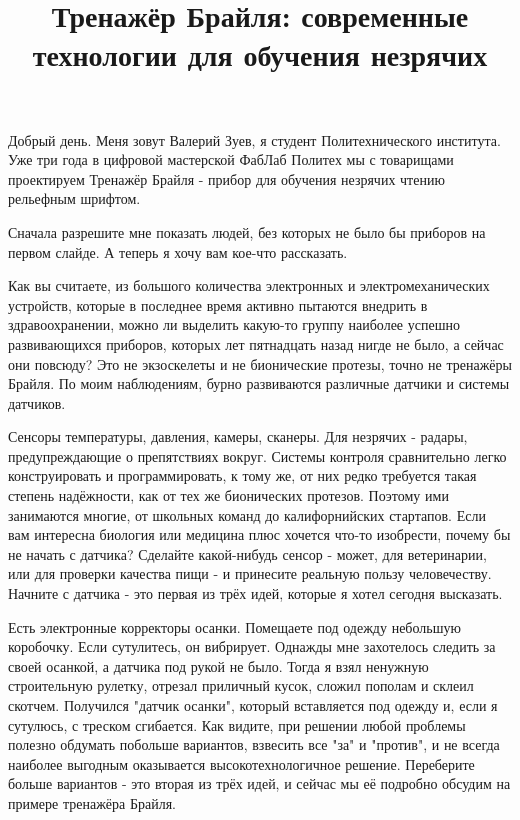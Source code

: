 \documentclass[a4paper,12pt]{article} %
\begin{document}
	
\title{Тренажёр Брайля: современные технологии для обучения незрячих}
\date{\vspace{-5ex}} %

Добрый день. Меня зовут Валерий Зуев, я студент Политехнического института. Уже три года в цифровой мастерской ФабЛаб Политех мы с товарищами проектируем Тренажёр Брайля - прибор для обучения незрячих чтению рельефным шрифтом.

Сначала разрешите мне показать людей, без которых не было бы приборов на первом слайде. А теперь я хочу вам кое-что рассказать.

Как вы считаете, из большого количества электронных и электромеханических устройств, которые в последнее время активно пытаются внедрить в здравоохранении, можно ли выделить какую-то группу наиболее успешно развивающихся приборов, которых лет пятнадцать назад нигде не было, а сейчас они повсюду? Это не экзоскелеты и не бионические протезы, точно не тренажёры Брайля. По моим наблюдениям, бурно развиваются различные датчики и системы датчиков.

Сенсоры температуры, давления, камеры, сканеры. Для незрячих - радары, предупреждающие о препятствиях вокруг. Системы контроля сравнительно легко конструировать и программировать, к тому же, от них редко требуется такая степень надёжности, как от тех же бионических протезов. Поэтому ими занимаются многие, от школьных команд до калифорнийских стартапов. Если вам интересна биология или медицина плюс хочется что-то изобрести, почему бы не начать с датчика? Сделайте какой-нибудь сенсор - может, для ветеринарии, или для проверки качества пищи - и принесите реальную пользу человечеству. Начните с датчика - это первая из трёх идей, которые я хотел сегодня высказать.

Есть электронные корректоры осанки. Помещаете под одежду небольшую коробочку. Если сутулитесь, он вибрирует. Однажды мне захотелось следить за своей осанкой, а датчика под рукой не было. Тогда я взял ненужную строительную рулетку, отрезал приличный кусок, сложил пополам и склеил скотчем. Получился "датчик осанки", который вставляется под одежду и, если я сутулюсь, с треском сгибается. Как видите, при решении любой проблемы полезно обдумать побольше вариантов, взвесить все "за" и "против", и не всегда наиболее выгодным оказывается высокотехнологичное решение. Переберите больше вариантов - это вторая из трёх идей, и сейчас мы её подробно обсудим на примере тренажёра Брайля.
\end{document}
